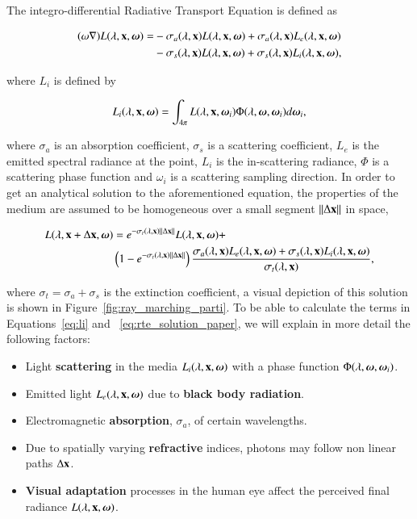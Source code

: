 The integro-differential Radiative Transport Equation is defined as

\begin{equation}
\begin{split}
(\omega \nabla) L(\lambda, \mathbf{x}, \boldsymbol{\omega}) = &- \sigma_a(\lambda, \mathbf{x}) L(\lambda, \mathbf{x}, \boldsymbol{\omega}) + \sigma_a(\lambda, \mathbf{x}) L_e(\lambda, \mathbf{x}, \boldsymbol{\omega}) \\
&- \sigma_s(\lambda, \mathbf{x}) L(\lambda, \mathbf{x}, \boldsymbol{\omega}) + \sigma_s(\lambda, \mathbf{x}) L_i(\lambda, \mathbf{x}, \boldsymbol{\omega}),
\end{split}
\end{equation}

where $L_i$ is defined by

\begin{equation}
\label{eq:li}
L_i(\lambda, \mathbf{x}, \boldsymbol{\omega}) = \int_{4 \pi} L(\lambda, \mathbf{x}, \boldsymbol{\omega}_i) \Phi (\lambda, \boldsymbol{\omega}, \boldsymbol{\omega}_i) d \boldsymbol{\omega}_i,
\end{equation}

where $\sigma_a$ is an absorption coefficient, $\sigma_s$ is a scattering coefficient, $L_e$ is the emitted spectral radiance at the point, $L_i$ is the in-scattering radiance, $\Phi$ is a scattering phase function and $\omega_i$ is a scattering sampling direction.
In order to get an analytical solution to the aforementioned equation, the properties of the medium are assumed to be homogeneous over a small segment $\left \| \Delta \mathbf{x} \right \|$ in space,

\begin{equation}
\label{eq:rte_solution_paper}
\begin{split}
L(\lambda, \mathbf{x} + \Delta\mathbf{x}, \boldsymbol{\omega}) &= e^{-\sigma_t(\lambda, \mathbf{x}) \left \| \Delta \mathbf{x} \right \|} L(\lambda, \mathbf{x}, \boldsymbol{\omega}) +  \\
& \left(1 - e^{-\sigma_t(\lambda, \mathbf{x}) \left \| \Delta \mathbf{x} \right \|} \right) \frac{\sigma_a(\lambda, \mathbf{x}) L_e(\lambda, \mathbf{x}, \boldsymbol{\omega}) + \sigma_s(\lambda, \mathbf{x}) L_i(\lambda, \mathbf{x}, \boldsymbol{\omega})}{\sigma_t(\lambda, \mathbf{x})},
\end{split}
\end{equation}

where $\sigma_t = \sigma_a + \sigma_s$ is the extinction coefficient, a visual depiction of this solution is shown in Figure~\ref{fig:ray_marching_parti}.
To be able to calculate the terms in Equations~\ref{eq:li} and ~\ref{eq:rte_solution_paper}, we will explain in more detail the following factors:

\begin{itemize}
\item Light \textbf{scattering} in the media $L_i(\lambda, \mathbf{x}, \boldsymbol{\omega})$ with a phase function $\Phi(\lambda, \boldsymbol{\omega}, \boldsymbol{\omega}_i)$.
\item Emitted light $L_e(\lambda, \mathbf{x}, \boldsymbol{\omega})$ due to \textbf{black body radiation}.
\item Electromagnetic \textbf{absorption}, $\sigma_a$, of certain wavelengths.
\item Due to spatially varying \textbf{refractive} indices, photons may follow non linear paths $\Delta\mathbf{x}$.
\item \textbf{Visual adaptation} processes in the human eye affect the perceived final radiance $L(\lambda, \mathbf{x}, \boldsymbol{\omega})$.
\end{itemize}

